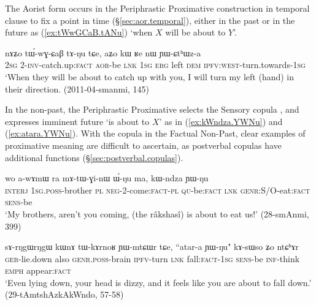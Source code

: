 The Aorist form  occurs in the Periphrastic Proximative construction in temporal clause to fix a point in time (§\ref{sec:aor.temporal}), either in the past or in the future as (\ref{ex:tWwGCaB.tANu}) `when $X$ will be about to $Y$'.

\begin{exe} 
\ex \label{ex:tWwGCaB.tANu}
\gll  nɤʑo tɯ́-wɣ-ɕaβ tɤ-ŋu tɕe, aʑo kɯ ʁe nɯ ɲɯ-ɕtʰɯz-a \\
\textsc{2sg} 2-\textsc{inv}-catch.up:\textsc{fact} \textsc{aor}-be \textsc{lnk} \textsc{1sg} \textsc{erg} left \textsc{dem} \textsc{ipfv}:\textsc{west}-turn.towards-\textsc{1sg} \\ 
\glt `When they will be about to catch up with you, I will turn my left (hand) in their direction. (2011-04-smanmi, 145)
 \end{exe}
 
In the non-past, the Periphrastic Proximative selects the Sensory copula , and expresses imminent future `is about to $X$' as in (\ref{ex:kWndza.YWNu}) and (\ref{ex:atara.YWNu}). With the copula in the Factual Non-Past, clear examples of proximative meaning are difficult to ascertain, as postverbal copulas have additional functions (§\ref{sec:postverbal.copulas}).

 \begin{exe} 
\ex \label{ex:kWndza.YWNu}
\gll  wo a-wɤmɯ ra mɤ-tɯ-ɣi-nɯ ɯ́-ŋu ma, kɯ-ndza ɲɯ-ŋu \\
\textsc{interj} \textsc{1sg}.\textsc{poss}-brother \textsc{pl} \textsc{neg}-2-come:\textsc{fact}-\textsc{pl} \textsc{qu}-be:\textsc{fact} \textsc{lnk} \textsc{genr}:S/O-eat:\textsc{fact} \textsc{sens}-be \\
\glt `My brothers, aren't you coming, (the râkshasî) is about to eat us!' (28-smAnmi, 399)
 \end{exe}

 \begin{exe} 
\ex \label{ex:atara.YWNu}
\gll sɤ-rŋgɯ\redp{}rŋgɯ kɯnɤ tɯ-kɤrnoʁ ɲɯ-mtɕɯr tɕe, ``atar-a ɲɯ-ŋu" kɤ-sɯso ʑo ntɕʰɤr \\
\textsc{ger}-lie.down also \textsc{genr}.\textsc{poss}-brain \textsc{ipfv}-turn \textsc{lnk} fall:\textsc{fact}-\textsc{1sg} \textsc{sens}-be \textsc{inf}-think \textsc{emph} appear:\textsc{fact} \\
\glt `Even lying down, your head is dizzy, and it feels like you are about to fall down.' (29-tAmtshAzkAkWndo, 57-58)
 \end{exe}
 

